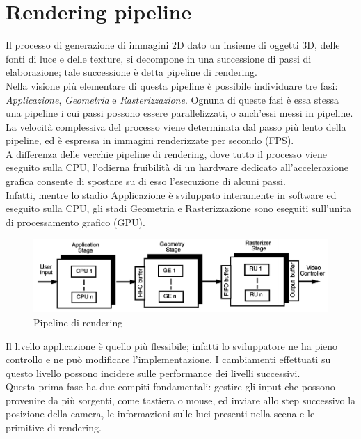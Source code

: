 \section{Rendering pipeline}
\label{sec:chapter_stato_arte_rendering_pipeline}

Il processo di generazione di immagini 2D dato un insieme di oggetti 3D, delle fonti di luce e delle texture, si decompone in una successione di passi di elaborazione; tale successione è detta pipeline di rendering.
\\
Nella visione più elementare di questa pipeline è possibile individuare tre fasi: \emph{Applicazione}, \emph{Geometria} e \emph{Rasterizzazione}.
Ognuna di queste fasi è essa stessa una pipeline i cui passi possono essere parallelizzati, o anch’essi messi in pipeline. La velocità complessiva del processo viene determinata dal passo più lento della pipeline, ed è espressa in immagini renderizzate per secondo (FPS).
\\
A differenza delle vecchie pipeline di rendering, dove tutto il processo viene eseguito sulla CPU, l’odierna fruibilità di un hardware dedicato all’accelerazione grafica consente di spostare su di esso l’esecuzione di alcuni passi. 
\\
Infatti, mentre lo stadio Applicazione è sviluppato interamente in software ed eseguito sulla CPU, gli stadi Geometria e Rasterizzazione sono eseguiti sull’unita di processamento grafico (GPU).
\newpage
\begin{figure}[htb]
 \centering
 \includegraphics[width=1.0\linewidth]{images/chapter_stato_arte/stato_arte_pipeline.png}\hfill
 \caption[Pipeline di rendering]{Pipeline di rendering}
 \label{fig:stato_arte_pipeline}
\end{figure}
Il livello applicazione è quello più flessibile; infatti lo sviluppatore ne ha pieno controllo e ne può modificare l’implementazione. I cambiamenti effettuati su questo livello possono incidere sulle performance dei livelli successivi.
\\
Questa prima fase ha due compiti fondamentali: gestire gli input che possono provenire da più sorgenti, come tastiera o mouse, ed inviare allo step successivo la posizione della camera, le informazioni sulle luci presenti nella scena e le primitive di rendering.
